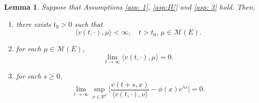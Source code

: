 \documentclass[12pt,a4paper]{amsart}
\theoremstyle{plain}
\newtheorem{lem}[thm]{Lemma}
\theoremstyle{definition}
\numberwithin{equation}{section}
\begin{document}
\begin{lem}\label{lem:extinc}
	Suppose that Assumptions \ref{asp: 1}, \ref{asp:IU} and \ref{asp: 3} hold. Then,
\begin{enumerate}
\item
	there exists $t_0>0$ such that
\[
	\langle v(t,\cdot),\mu\rangle <\infty, \quad t>t_0, \,
\mu \in \mathcal M(E).
\]
\item
	for each $\mu \in \mathcal M(E)$,
\[
	\lim_{t\rightarrow\infty}\langle v(t,\cdot),\mu\rangle=0.
\]
\item
	for each $s\geq 0$,
\begin{equation} \label{one point ratio limit}
	\lim_{t\to \infty} \sup_{x\in \mathbb R^d}\Big|\frac{v(t+s,x)}{\langle v(t,\cdot),\nu\rangle } - \phi(x)e^{\lambda s} \Big|
	=0.
\end{equation}
\end{enumerate}
\end{lem}
\end{document}
